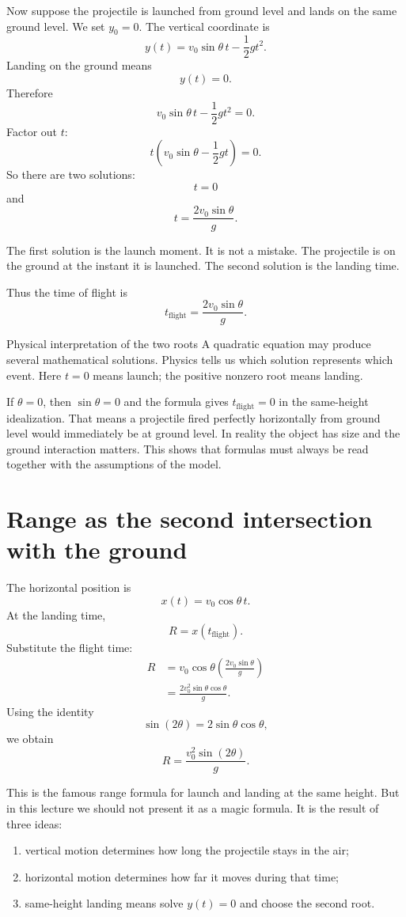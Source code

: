 \documentclass[11pt,a4paper]{article}
\newcommand{\tflight}{t_{\mathrm{flight}}}
\begin{document}
Now suppose the projectile is launched from ground level and lands on the same ground level. We set $y_0=0$. The vertical coordinate is
\[
y(t)=v_0\sin\theta\,t-\frac12gt^2.
\]
Landing on the ground means
\[
y(t)=0.
\]
Therefore
\[
v_0\sin\theta\,t-\frac12gt^2=0.
\]
Factor out $t$:
\[
t\left(v_0\sin\theta-\frac12gt\right)=0.
\]
So there are two solutions:
\[
t=0
\]
and
\[
t=\frac{2v_0\sin\theta}{g}.
\]

The first solution is the launch moment. It is not a mistake. The projectile is on the ground at the instant it is launched. The second solution is the landing time.

Thus the time of flight is
\[
\boxed{\tflight=\frac{2v_0\sin\theta}{g}.}
\]

\begin{methodbox}{Physical interpretation of the two roots}
A quadratic equation may produce several mathematical solutions. Physics tells us which solution represents which event. Here $t=0$ means launch; the positive nonzero root means landing.
\end{methodbox}

If $\theta=0$, then $\sin\theta=0$ and the formula gives $\tflight=0$ in the same-height idealization. That means a projectile fired perfectly horizontally from ground level would immediately be at ground level. In reality the object has size and the ground interaction matters. This shows that formulas must always be read together with the assumptions of the model.

\section{Range as the second intersection with the ground}

The horizontal position is
\[
x(t)=v_0\cos\theta\,t.
\]
At the landing time,
\[
R=x(\tflight).
\]
Substitute the flight time:
\begin{align*}
R&=v_0\cos\theta\left(\frac{2v_0\sin\theta}{g}\right) \\
&=\frac{2v_0^2\sin\theta\cos\theta}{g}.
\end{align*}
Using the identity
\[
\sin(2\theta)=2\sin\theta\cos\theta,
\]
we obtain
\[
\boxed{R=\frac{v_0^2\sin(2\theta)}{g}.}
\]

This is the famous range formula for launch and landing at the same height. But in this lecture we should not present it as a magic formula. It is the result of three ideas:
\begin{enumerate}
    \item vertical motion determines how long the projectile stays in the air;
    \item horizontal motion determines how far it moves during that time;
    \item same-height landing means solve $y(t)=0$ and choose the second root.
\end{enumerate}
\end{document}
